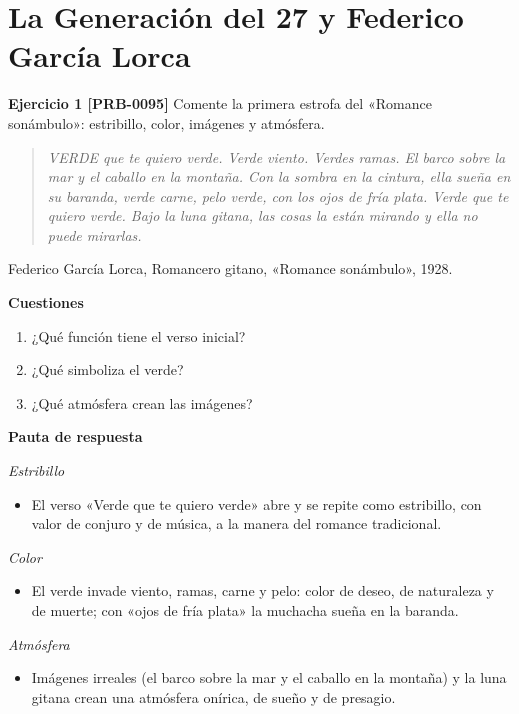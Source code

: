 \documentclass{book}
\begin{document}
\section{La Generación del 27 y Federico García Lorca}

\noindent\textbf{Ejercicio 1 [PRB-0095]}
Comente la primera estrofa del «Romance sonámbulo»: estribillo, color, imágenes y atmósfera.


\begin{quote}
\itshape VERDE que te quiero verde. Verde viento. Verdes ramas. El barco sobre la mar y el caballo en la montaña. Con la sombra en la cintura, ella sueña en su baranda, verde carne, pelo verde, con los ojos de fría plata. Verde que te quiero verde. Bajo la luna gitana, las cosas la están mirando y ella no puede mirarlas.
\end{quote}
{\noindent\footnotesize Federico García Lorca, Romancero gitano, «Romance sonámbulo», 1928.\par}

\noindent\textbf{Cuestiones}
\begin{enumerate}
\item ¿Qué función tiene el verso inicial?
\item ¿Qué simboliza el verde?
\item ¿Qué atmósfera crean las imágenes?
\end{enumerate}

\noindent\textbf{Pauta de respuesta}

\noindent\textit{Estribillo}
\begin{itemize}
\item El verso «Verde que te quiero verde» abre y se repite como estribillo, con valor de conjuro y de música, a la manera del romance tradicional.
\end{itemize}

\noindent\textit{Color}
\begin{itemize}
\item El verde invade viento, ramas, carne y pelo: color de deseo, de naturaleza y de muerte; con «ojos de fría plata» la muchacha sueña en la baranda.
\end{itemize}

\noindent\textit{Atmósfera}
\begin{itemize}
\item Imágenes irreales (el barco sobre la mar y el caballo en la montaña) y la luna gitana crean una atmósfera onírica, de sueño y de presagio.
\end{itemize}
\end{document}
